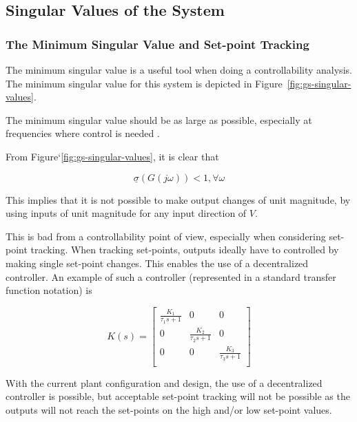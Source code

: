 \subsection{Singular Values of the System}

\subsubsection{The Minimum Singular Value and Set-point Tracking}

The minimum singular value is a useful tool when doing a controllability analysis. The minimum singular value for this system is depicted in Figure~\ref{fig:gs-singular-values}.

The minimum singular value should be as large as possible, especially at frequencies where control is needed \parencite{skogestad}.

From Figure`\ref{fig:gs-singular-values}, it is clear that

\begin{equation}
	\label{eq: Min singular alue criteria}
	\underline{\sigma}(G(j\omega)) < 1 , \forall \omega
\end{equation}

This implies that it is not possible to make output changes of unit magnitude, by using inputs of unit magnitude for any input direction of $V$. 

This is bad from a controllability point of view, especially when considering set-point tracking. When tracking set-points, outputs ideally have to controlled by making single set-point changes. This enables the use of a decentralized controller. An example of such a controller (represented in a standard transfer function notation) is

\begin{equation}
	K(s) = \begin{bmatrix}
	\frac{K_1}{\tau_1s + 1} & 0 & 0\\
	 0 &\frac{K_2}{\tau_2s + 1} & 0\\
	 0 & 0 & \frac{K_3}{\tau_3s + 1}\\
	\end{bmatrix}
\end{equation} 

With the current plant configuration and design, the use of a decentralized controller is possible, but acceptable set-point tracking will not be possible as the outputs will not reach the set-points on the high and/or low set-point values.

